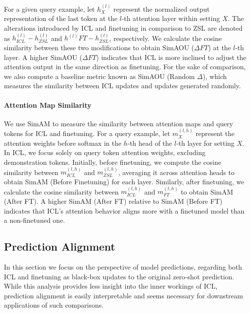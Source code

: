 For a given query example, let $h^{(l)}_X$ represent the normalized output representation of the last token at the $l$-th attention layer within setting $X$. The alterations introduced by ICL and finetuning in comparison to ZSL are denoted as $h^{(l)}_{ICL} - h^{(l)}_{ZSL}$ and $h^{(l)}{FT} - h^{(l)}_{ZSL}$, respectively. We calculate the cosine similarity between these two modifications to obtain SimAOU ($\Delta FT$) at the $l$-th layer. A higher SimAOU ($\Delta FT$) indicates that ICL is more inclined to adjust the attention output in the same direction as finetuning.
For the sake of comparison, we also compute a baseline metric known as SimAOU (Random $\Delta$), which measures the similarity between ICL updates and updates generated randomly.

\paragraph{Attention Map Similarity}
We use SimAM to measure the similarity between attention maps and query tokens for ICL and finetuning.
For a query example, let $m^{(l,h)}_X$ represent the attention weights before softmax in the $h$-th head of the $l$-th layer for setting $X$. In ICL, we focus solely on query token attention weights, excluding demonstration tokens. Initially, before finetuning, we compute the cosine similarity between $m^{(l,h)}_{ICL}$ and $m^{(l,h)}_{ZSL}$, averaging it across attention heads to obtain SimAM (Before Finetuning) for each layer.
Similarly, after finetuning, we calculate the cosine similarity between $m^{(l,h)}_{ICL}$ and $m^{(l,h)}_{FT}$ to obtain SimAM (After FT). A higher SimAM (After FT) relative to SimAM (Before FT) indicates that ICL's attention behavior aligns more with a finetuned model than a non-finetuned one.


\subsection{Prediction Alignment}
In this section we focus on the perspective of model predictions, regarding both ICL and finetuning as black-box updates to the original zero-shot prediction.
While this analysis provides less insight into the inner workings of ICL, prediction alignment is easily interpretable and seems necessary for downstream applications of such comparisons.

